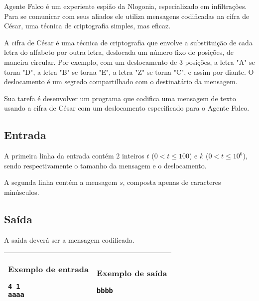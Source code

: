 Agente Falco é um experiente espião da Nlogonia, especializado em infiltrações. Para se comunicar com seus aliados ele utiliza mensagens codificadas na cifra de César, uma técnica de criptografia simples, mas eficaz.

A cifra de César é uma técnica de criptografia que envolve a substituição de cada letra do alfabeto por outra letra, deslocada um número fixo de posições, de maneira circular. Por exemplo, com um deslocamento de 3 posições, a letra "A" se torna "D", a letra "B" se torna "E", a letra "Z" se torna "C", e assim por diante. O deslocamento é um segredo compartilhado com o destinatário da mensagem.

Sua tarefa é desenvolver um programa que codifica uma mensagem de texto usando a cifra de César com um deslocamento especificado para o Agente Falco.
\subsection*{Entrada}
 
A primeira linha da entrada  contém 2 inteiros $t$ ($0 < t \leq 100$) e $k$ ($0 < t \leq 10^6$), sendo respectivamente o tamanho da mensagem e o deslocamento.
 
A segunda linha contém a mensagem $s$, composta apenas de caracteres minúsculos.
 
\subsection*{Saída}
A saida deverá ser a mensagem codificada.

\begin{table}[!h]
\centering
\begin{tabular}{|l|l|}
\hline
\begin{minipage}[t]{3in}
\textbf{Exemplo de entrada}
\begin{verbatim}
4 1
aaaa
\end{verbatim}
\vspace{1mm}
\end{minipage}
&
\begin{minipage}[t]{3in}
\textbf{Exemplo de saída}
\begin{verbatim}
bbbb
\end{verbatim}
\vspace{1mm}
\end{minipage} \\
\hline
\end{tabular}
\end{table}

